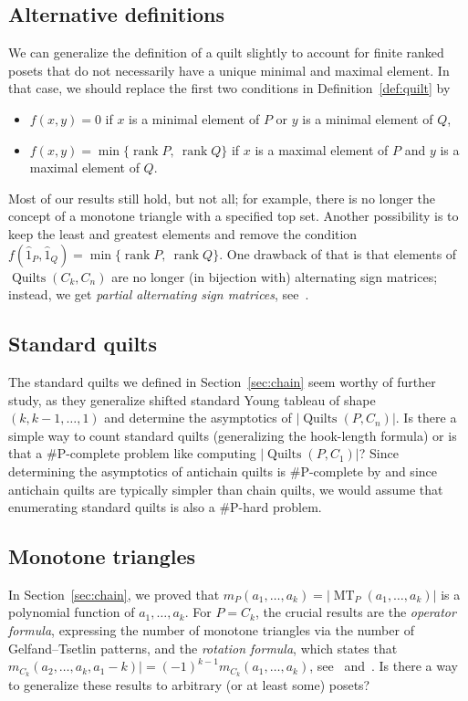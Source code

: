 \documentclass[12pt]{amsart}
\numberwithin{equation}{section}
\theoremstyle{definition}
\newcommand{\MT}{\operatorname{MT}}
\newcommand{\quilt}{\operatorname{Quilts}}
\newcommand{\rank}{\operatorname{rank}}
\begin{document}
\subsection*{Alternative definitions} We can generalize the definition
of a quilt slightly to account for finite ranked posets that do not
necessarily have a unique minimal and maximal element. In that case, we should replace the first two conditions in Definition~\ref{def:quilt} by
\begin{itemize}
 \item $f(x,y) = 0$ if $x$ is a minimal element of $P$ or $y$ is a minimal element of $Q$,
 \item $f(x,y) = \min\{\rank P,\ \rank Q\}$ if $x$ is a maximal element of $P$ and $y$ is a maximal element of $Q$.
\end{itemize}
Most of our results still hold, but not all; for example, there is no longer the concept of a monotone triangle with a specified top set.
Another possibility is to keep the least and greatest elements and remove the condition $f(\hat 1_P, \hat 1_Q) = \min\{\rank P,\ \rank Q\}$. One drawback of that is that elements of $\quilt(C_k,C_n)$ are no longer (in bijection with) alternating sign matrices; instead, we get \emph{partial alternating sign matrices}, see~\cite{partialASM}.


\subsection*{Standard quilts} The standard quilts
we defined in Section~\ref{sec:chain} seem worthy of further study, as
they generalize shifted standard Young tableau of shape
$(k,k-1,\ldots,1)$ and determine the asymptotics of $|\quilt(P, C_n)|$. Is there a simple way to count standard quilts
(generalizing the hook-length formula) or is that a \#P-complete
problem like computing $|\quilt(P, C_1)|$? Since determining the asymptotics of antichain quilts is \#P-complete by  and since antichain quilts are typically simpler than chain quilts, we would assume that enumerating standard quilts is also a \#P-hard problem.




\subsection*{Monotone triangles} In Section~\ref{sec:chain}, we proved
that $m_P(a_1,\ldots,a_k)=|\MT_P(a_1,\ldots,a_k)|$ is a polynomial
function of $a_{1},\dotsc ,a_{k}$. For $P = C_k$, the crucial results
are the \emph{operator formula}, expressing the number of monotone
triangles via the number of Gelfand--Tsetlin patterns, and the
\emph{rotation formula}, which states that
$m_{C_k}(a_2,\ldots,a_k,a_1-k)| = (-1)^{k-1} m_{C_k}(a_1,\ldots,a_k)$,
see~\cite[Theorem 1]{MTs} and~\cite[Lemma 5]{Fischer.2005}. Is there a
way to generalize these results to arbitrary (or at least some)
posets?
\end{document}
